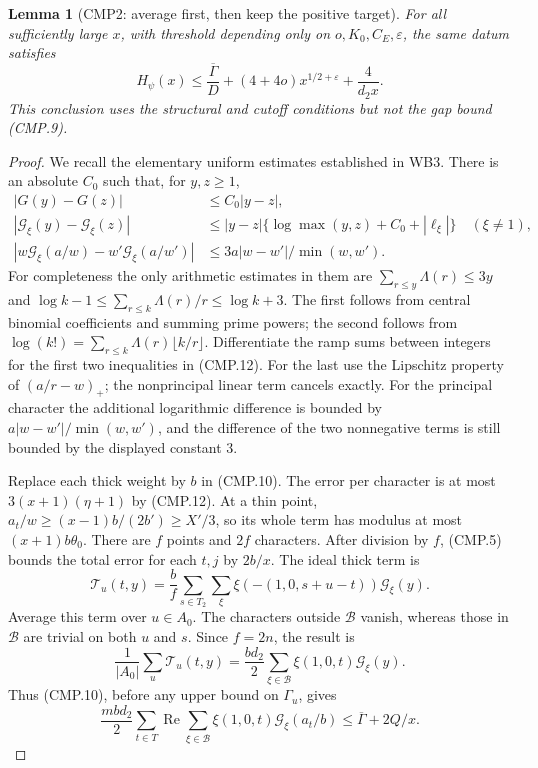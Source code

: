 \documentclass[11pt,a4paper]{article}
\numberwithin{equation}{section}
\newtheorem{lemma}[theorem]{Lemma}
\theoremstyle{remark}\newtheorem{remark}[theorem]{Remark}
\begin{document}
\begin{lemma}[CMP2: average first, then keep the positive target]
\label{claim:CMP2}
For all sufficiently large $x$, with threshold depending only on
$o,\allowbreak{} K_0,\allowbreak{} C_E,\varepsilon$, the same datum satisfies
\[
 H_\psi(x)\le\frac{\overline\Gamma}{D}
        +(4+4o)x^{1/2+\varepsilon}+\frac4{d_2x}.
 \tag{CMP.11}
\]
This conclusion uses the structural and cutoff conditions but not
the gap bound (CMP.9).
\end{lemma}
\begin{proof}
We recall the elementary uniform estimates established in WB3.
There is an absolute $C_0$ such that, for $y,\allowbreak{} z\ge1$,
\begin{align*}
 |G(y)-G(z)|&\le C_0|y-z|,\\
 |\mathcal G_\xi(y)-\mathcal G_\xi(z)|
 &\le |y-z|\{\log\max(y,\allowbreak{} z)+C_0+|\ell_\xi|\}\quad(\xi\ne1),\\
 |w\mathcal G_\xi(a/w)-w'\mathcal G_\xi(a/w')|
 &\le3a|w-w'|/\min(w,\allowbreak{} w').
                                                               \tag{CMP.12}
\end{align*}
For completeness the only arithmetic estimates in them are
$\sum_{r\le y}\Lambda(r)\le3y$ and
$\log k-1\le\sum_{r\le k}\Lambda(r)/r\le\log k+3$.
The first follows from central binomial coefficients and summing
prime powers; the second follows from
$\log(k!)=\sum_{r\le k}\Lambda(r)\lfloor k/r\rfloor$.
Differentiate the ramp sums between integers for the first two
inequalities in (CMP.12).  For the last use the Lipschitz property
of $(a/r-w)_+$; the nonprincipal linear term cancels exactly.
For the principal character the additional logarithmic difference
is bounded by $a|w-w'|/\min(w,\allowbreak{} w')$, and the difference of the two
nonnegative terms is still bounded by the displayed constant $3$.

Replace each thick weight by $b$ in (CMP.10).  The error per
character is at most $3(x+1)(\eta+1)$ by (CMP.12).
At a thin point,
$a_t/w\ge(x-1)b/(2b')\ge X'/3$, so its whole term has modulus
at most $(x+1)b\theta_0$.  There are $f$ points and $2f$
characters.  After division by $f$, (CMP.5) bounds the total error
for each $t,\allowbreak{} j$ by $2b/x$.
The ideal thick term is
\[
 \mathcal T_u(t,\allowbreak{} y)=\frac b f\sum_{s\in T_2}\sum_\xi
             \xi(-(1,0,\allowbreak{} s+u-t))\mathcal G_\xi(y).
\]
Average this term over $u\in A_0$.  The characters outside
$\mathcal B$ vanish, whereas those in $\mathcal B$ are trivial
on both $u$ and $s$.  Since $f=2n$, the result is
\[
 \frac1{|A_0|}\sum_u\mathcal T_u(t,\allowbreak{} y)
       =\frac{bd_2}{2}\sum_{\xi\in\mathcal B}
                                   \xi(1,0,\allowbreak{} t)\mathcal G_\xi(y).
\]
Thus (CMP.10), before any upper bound on $\Gamma_u$, gives
\[
 \frac{mbd_2}{2}\sum_{t\in T}
       \operatorname{Re}\sum_{\xi\in\mathcal B}
               \xi(1,0,\allowbreak{} t)\mathcal G_\xi(a_t/b)
                  \le\overline\Gamma+2Q/x.          \tag{CMP.13}
\]


\end{proof}
\end{document}

